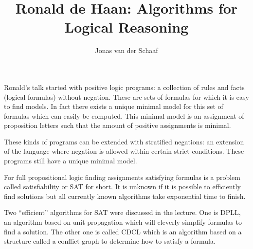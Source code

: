 \documentclass{article}
\title{Ronald de Haan: Algorithms for Logical Reasoning}
\author{Jonas van der Schaaf}
\date{}
\begin{document}
\maketitle

Ronald's talk started with positive logic programs: a collection of rules and
facts (logical formulas) without negation. These are sets of formulas for which
it is easy to find models. In fact there exists a unique minimal model for this
set of formulas which can easily be computed. This minimal model is an
assignment of proposition letters such that the amount of positive assignments
is minimal.

These kinds of programs can be extended with stratified negations: an extension
of the language where negation is allowed within certain strict conditions.
These programs still have a unique minimal model.

For full propositional logic finding assignments satisfying formulas is a
problem called satisfiability or SAT for short. It is unknown if it is possible
to efficiently find solutions but all currently known algorithms take
exponential time to finish.

Two ``efficient'' algorithms for SAT were discussed in the lecture. One is DPLL,
an algorithm based on unit propagation which will cleverly simplify formulas to
find a solution. The other one is called CDCL which is an algorithm based on a
structure called a conflict graph to determine how to satisfy a formula.
\end{document}
